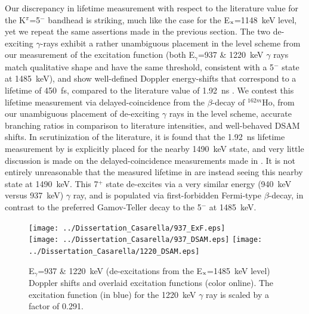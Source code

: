 Our discrepancy in lifetime measurement with respect to the literature value for the K$^\pi$=5$^-$ bandhead is striking, much like the case for the E$_{\rm x}$=1148~keV level, yet we repeat the same assertions made in the previous section. The two de-exciting $\gamma$-rays exhibit a rather unambiguous placement in the level scheme from our measurement of the excitation function (both E$_\gamma$=937 \& 1220~keV $\gamma$ rays match qualitative shape and have the same threshold, consistent with a 5$^-$ state at 1485~keV), and show well-defined Doppler energy-shifts that correspond to a lifetime of 450~fs, compared to the literature value of 1.92~ns \cite{Honig_5minus1969}. We contest this lifetime measurement via delayed-coincidence from the $\beta$-decay of $^{162m}$Ho, from our unambiguous placement of de-exciting $\gamma$ rays in the level scheme, accurate branching ratios in comparison to literature intensities, and well-behaved DSAM shifts. In scrutinization of the literature, it is found that the 1.92~ns lifetime measurement by \cite{Honig_5minus1969} is explicitly placed for the nearby 1490~keV state, and very little discussion is made on the delayed-coincidence measurements made in \cite{CHARVET_162Dy5minus}. It is not entirely unreasonable that the measured lifetime in \cite{Honig_5minus1969,CHARVET_162Dy5minus} are instead seeing this nearby state at 1490~keV. This 7$^+$ state de-excites via a very similar energy (940~keV versus 937~keV) $\gamma$ ray, and is populated via first-forbidden Fermi-type $\beta$-decay, in contrast to the preferred Gamov-Teller decay to the 5$^-$ at 1485~keV. 

\begin{figure}[h!]
\begin{center}
\texttt{[image: ../Dissertation\_Casarella/937\_ExF.eps]}\\
\texttt{[image: ../Dissertation\_Casarella/937\_DSAM.eps]}
\texttt{[image: ../Dissertation\_Casarella/1220\_DSAM.eps]}
\caption{E$_\gamma$=937 \& 1220~keV (de-excitations from the E$_{\rm x}$=1485~keV level) Doppler shifts and overlaid excitation functions (color online). The excitation function (in blue) for the 1220~keV $\gamma$ ray is scaled by a factor of 0.291. \label{fig:1485_DSAM_EXF}}
\end{center}
\end{figure}



